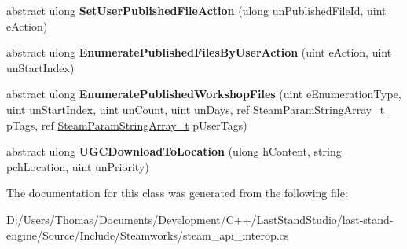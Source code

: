 \begin{DoxyCompactItemize}
\item 
\hypertarget{classValve_1_1Steamworks_1_1ISteamRemoteStorage_a37bcae481ec3329285b9efda49df20f1}{}abstract ulong {\bfseries Set\+User\+Published\+File\+Action} (ulong un\+Published\+File\+Id, uint e\+Action)\label{classValve_1_1Steamworks_1_1ISteamRemoteStorage_a37bcae481ec3329285b9efda49df20f1}

\item 
\hypertarget{classValve_1_1Steamworks_1_1ISteamRemoteStorage_aaf73bf4617e9834146924c813aaecdb3}{}abstract ulong {\bfseries Enumerate\+Published\+Files\+By\+User\+Action} (uint e\+Action, uint un\+Start\+Index)\label{classValve_1_1Steamworks_1_1ISteamRemoteStorage_aaf73bf4617e9834146924c813aaecdb3}

\item 
\hypertarget{classValve_1_1Steamworks_1_1ISteamRemoteStorage_ababa473d5722150ac7f8d979722a6a1f}{}abstract ulong {\bfseries Enumerate\+Published\+Workshop\+Files} (uint e\+Enumeration\+Type, uint un\+Start\+Index, uint un\+Count, uint un\+Days, ref \hyperlink{structValve_1_1Steamworks_1_1SteamParamStringArray__t}{Steam\+Param\+String\+Array\+\_\+t} p\+Tags, ref \hyperlink{structValve_1_1Steamworks_1_1SteamParamStringArray__t}{Steam\+Param\+String\+Array\+\_\+t} p\+User\+Tags)\label{classValve_1_1Steamworks_1_1ISteamRemoteStorage_ababa473d5722150ac7f8d979722a6a1f}

\item 
\hypertarget{classValve_1_1Steamworks_1_1ISteamRemoteStorage_adef9287cf9911bfe98cfada28b0d0715}{}abstract ulong {\bfseries U\+G\+C\+Download\+To\+Location} (ulong h\+Content, string pch\+Location, uint un\+Priority)\label{classValve_1_1Steamworks_1_1ISteamRemoteStorage_adef9287cf9911bfe98cfada28b0d0715}

\end{DoxyCompactItemize}


The documentation for this class was generated from the following file\+:\begin{DoxyCompactItemize}
\item 
D\+:/\+Users/\+Thomas/\+Documents/\+Development/\+C++/\+Last\+Stand\+Studio/last-\/stand-\/engine/\+Source/\+Include/\+Steamworks/steam\+\_\+api\+\_\+interop.\+cs\end{DoxyCompactItemize}
